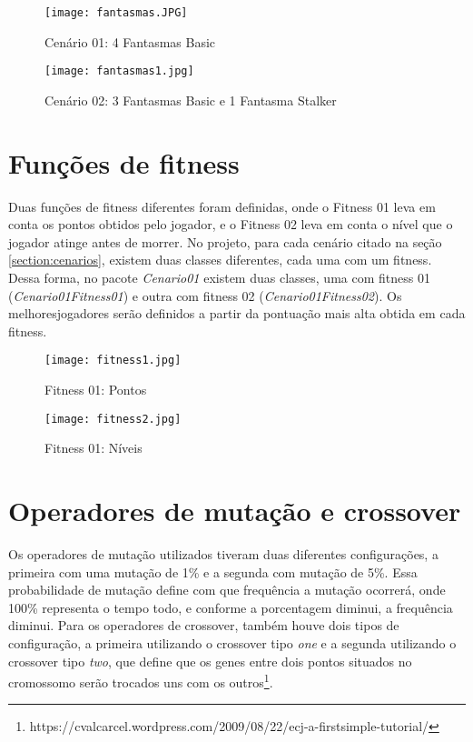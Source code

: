 \documentclass[12pt, a4paper, english, brazil]{abntex2}
\begin{document}
\begin{figure}[H]
\centering
\texttt{[image: fantasmas.JPG]}
\caption{Cenário 01: 4 Fantasmas Basic}
\label{fig:Cenario1}
\end{figure}

\begin{figure}[H]
\centering
\texttt{[image: fantasmas1.jpg]}
\caption{Cenário 02: 3 Fantasmas Basic e 1 Fantasma Stalker}
\label{fig:Cenario2}
\end{figure}


\section{Funções de fitness}
Duas funções de fitness diferentes foram definidas, onde o Fitness 01 leva em conta os pontos obtidos pelo jogador, e o Fitness 02 leva em conta o nível que o jogador atinge antes de morrer. No projeto, para cada cenário citado na seção \ref{section:cenarios}, existem duas classes diferentes, cada uma com um fitness. Dessa forma, no pacote \textit{Cenario01} existem duas classes, uma com fitness 01 (\textit{Cenario01Fitness01}) e outra com fitness 02 (\textit{Cenario01Fitness02}).
Os melhoresjogadores serão definidos a partir da pontuação mais alta obtida em cada fitness. 
\begin{figure}[H]
\centering
\texttt{[image: fitness1.jpg]}
\caption{Fitness 01: Pontos}
\label{fig:Fitness01}
\end{figure}

\begin{figure}[H]
\centering
\texttt{[image: fitness2.jpg]}
\caption{Fitness 01: Níveis}
\label{fig:Fitness02}
\end{figure}

\section{Operadores de mutação e crossover}

Os operadores de mutação utilizados tiveram duas diferentes configurações, a primeira com uma mutação de 1\% e a segunda com mutação de 5\%. Essa probabilidade de mutação define com que frequência a mutação ocorrerá, onde 100\% representa o tempo todo, e conforme a porcentagem diminui, a frequência diminui. Para os operadores de crossover, também houve dois tipos de configuração, a primeira utilizando o crossover tipo \textit{one} e a segunda utilizando o crossover tipo \textit{two}, que define que os genes entre dois pontos situados no cromossomo serão trocados uns com os outros\footnote{https://cvalcarcel.wordpress.com/2009/08/22/ecj-a-firstsimple-tutorial/}.
\end{document}
